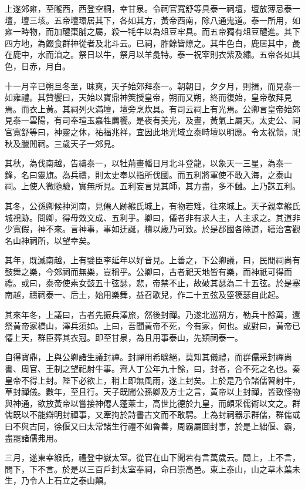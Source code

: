 上遂郊雍，至隴西，西登空桐，幸甘泉。令祠官寬舒等具泰一祠壇，壇放薄忌泰一壇，壇三垓。五帝壇環居其下，各如其方，黃帝西南，除八通鬼道。泰一所用，如雍一畤物，而加醴棗脯之屬，殺一牦牛以為俎豆牢具。而五帝獨有俎豆醴進。其下四方地，為餟食群神從者及北斗云。已祠，胙餘皆燎之。其牛色白，鹿居其中，彘在鹿中，水而洎之。祭日以牛，祭月以羊彘特。泰一祝宰則衣紫及繡。五帝各如其色，日赤，月白。

十一月辛已朔旦冬至，昧爽，天子始郊拜泰一。朝朝日，夕夕月，則揖，而見泰一如雍禮。其贊饗曰，天始以寶鼎神筴授皇帝，朔而又朔，終而復始，皇帝敬拜見焉。而衣上黃。其祠列火滿壇，壇旁烹炊具。有司云祠上有光焉。公卿言皇帝始郊見泰一雲陽，有司奉瑄玉嘉牲薦饗。是夜有美光，及晝，黃氣上屬天。太史公、祠官寬舒等曰，神靈之休，祐福兆祥，宜因此地光域立泰畤壇以明應。令太祝領，祀秋及臘閒祠。三歲天子一郊見。

其秋，為伐南越，告禱泰一，以牡荊畫幡日月北斗登龍，以象天一三星，為泰一鋒，名曰靈旗。為兵禱，則太史奉以指所伐國。而五利將軍使不敢入海，之泰山祠。上使人微隨驗，實無所見。五利妄言見其師，其方盡，多不讎。上乃誅五利。

其冬，公孫卿候神河南，見僊人跡緱氏城上，有物若雉，往來城上。天子親幸緱氏城視跡。問卿，得毋效文成、五利乎。卿曰，僊者非有求人主，人主求之。其道非少寬假，神不來。言神事，事如迂誕，積以歲乃可致。於是郡國各除道，繕治宮觀名山神祠所，以望幸矣。

其年，既滅南越，上有嬖臣李延年以好音見。上善之，下公卿議，曰，民閒祠尚有鼓舞之樂，今郊祠而無樂，豈稱乎。公卿曰，古者祀天地皆有樂，而神祇可得而禮。或曰，泰帝使素女鼓五十弦瑟，悲，帝禁不止，故破其瑟為二十五弦。於是塞南越，禱祠泰一、后土，始用樂舞，益召歌兒，作二十五弦及箜篌瑟自此起。

其來年冬，上議曰，古者先振兵澤旅，然後封禪。乃遂北巡朔方，勒兵十餘萬，還祭黃帝冢橋山，澤兵須如。上曰，吾聞黃帝不死，今有冢，何也。或對曰，黃帝已僊上天，群臣葬其衣冠。即至甘泉，為且用事泰山，先類祠泰一。

自得寶鼎，上與公卿諸生議封禪。封禪用希曠絕，莫知其儀禮，而群儒采封禪尚書、周官、王制之望祀射牛事。齊人丁公年九十餘，曰，封者，合不死之名也。秦皇帝不得上封。陛下必欲上，稍上即無風雨，遂上封矣。上於是乃令諸儒習射牛，草封禪儀。數年，至且行。天子既聞公孫卿及方士之言，黃帝以上封禪，皆致怪物與神通，欲放黃帝以嘗接神僊人蓬萊士，高世比德於九皇，而頗采儒術以文之。群儒既以不能辯明封禪事，又牽拘於詩書古文而不敢騁。上為封祠器示群儒，群儒或曰不與古同，徐偃又曰太常諸生行禮不如魯善，周霸屬圖封事，於是上絀偃、霸，盡罷諸儒弗用。

三月，遂東幸緱氏，禮登中嶽太室。從官在山下聞若有言萬歲云。問上，上不言，問下，下不言。於是以三百戶封太室奉祠，命曰崇高邑。東上泰山，山之草木葉未生，乃令人上石立之泰山顛。

